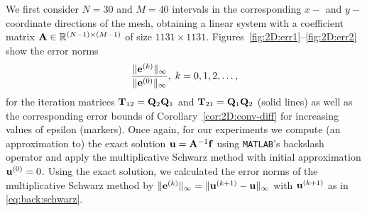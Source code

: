 We first consider $N = 30$ and $M = 40$ intervals in the corresponding $x-$ and
$y-$coordinate directions of the mesh, obtaining a linear system with a coefficient matrix  $\mathbf{A}\in\mathbb{R}^{(N-1)\times(M-1)}$ of size $1131 \times 1131$. Figures~\ref{fig:2D:err1}--\ref{fig:2D:err2} show the error norms
\[
\frac{\|\mathbf{e}^{(k)}\|_\infty}{\|\mathbf{e}^{(0)}\|_\infty },\;k=0,1,2,\ldots,
\]
for the iteration matrices $\mathbf{T}_{12}=\mathbf{Q}_2\mathbf{Q}_1$ and $\mathbf{T}_{21}=\mathbf{Q}_1\mathbf{Q}_2$ (solid lines) as well as
the corresponding error bounds of Corollary~\ref{cor:2D:conv-diff} for
increasing values of epsilon (markers). Once again, for our experiments we compute (an approximation to) the exact solution $\mathbf{u}=\mathbf{A}^{-1}\mathbf{f}$ using \texttt{MATLAB}'s backslash operator and apply the multiplicative Schwarz method with initial approximation $\mathbf{u}^{(0)}=0$. Using the exact solution, we calculated the error norms of the multiplicative Schwarz method by
$\|\mathbf{e}^{(k)}\|_\infty=\|\mathbf{u}^{(k+1)}-\mathbf{u}\|_\infty$ with $\mathbf{u}^{(k+1)}$
as in \eqref{eq:back:schwarz}.
%
